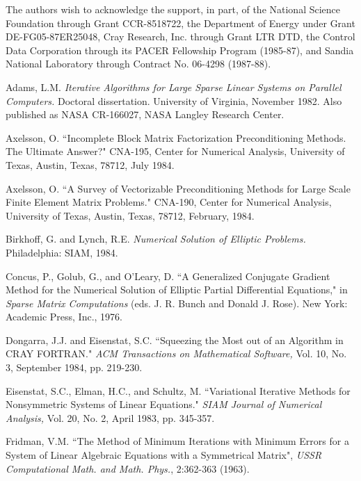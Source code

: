 The authors wish to acknowledge the support, in part, of the National 
Science Foundation through Grant CCR-8518722, the Department of Energy 
under Grant DE-FG05-87ER25048, Cray Research, Inc. through Grant LTR DTD,
the Control Data Corporation through its PACER Fellowship Program (1985-87), 
and Sandia National Laboratory through Contract No. 06-4298 (1987-88).

\newpage
\begin{thebibliography}{99}

 Adams, L.M. {\em Iterative Algorithms for Large
 Sparse Linear Systems on Parallel Computers.} Doctoral dissertation.
 University of Virginia, November 1982.  Also published as NASA
 CR-166027, NASA Langley Research Center.

 Axelsson, O. ``Incomplete Block Matrix
 Factorization Preconditioning Methods.  The Ultimate Answer?" 
 CNA-195, Center for Numerical Analysis, University of Texas, Austin, 
 Texas, 78712, July 1984.  

 Axelsson, O. ``A Survey of Vectorizable Preconditioning
 Methods for Large Scale Finite Element Matrix Problems." CNA-190,
 Center for Numerical Analysis, University of Texas, Austin, Texas,
 78712, February, 1984.

 Birkhoff, G. and Lynch, R.E. {\em Numerical Solution
 of Elliptic Problems.}  Philadelphia: SIAM, 1984.

 Concus, P., Golub, G., and O'Leary, D. ``A Generalized
 Conjugate Gradient Method for the Numerical Solution of Elliptic
 Partial Differential Equations," in {\em Sparse Matrix Computations}
 (eds. J. R. Bunch and Donald J. Rose).  New York: Academic Press, Inc.,
 1976. 

 Dongarra, J.J. and Eisenstat, S.C.
 ``Squeezing the Most out of an Algorithm in CRAY FORTRAN."
 {\em ACM Transactions on Mathematical Software,} Vol. 10, No. 3,
 September 1984, pp. 219-230. 

 Eisenstat, S.C., Elman, H.C., and Schultz, M.
 ``Variational Iterative Methods for Nonsymmetric Systems of
 Linear Equations." {\em SIAM Journal of Numerical Analysis,} Vol. 20,
 No. 2, April 1983, pp. 345-357.

 Fridman, V.M. ``The Method of Minimum Iterations
 with Minimum Errors for a System of Linear Algebraic Equations
 with a Symmetrical Matrix", {\em USSR Computational Math. and Math.
 Phys.}, 2:362-363 (1963).


\end{thebibliography}
